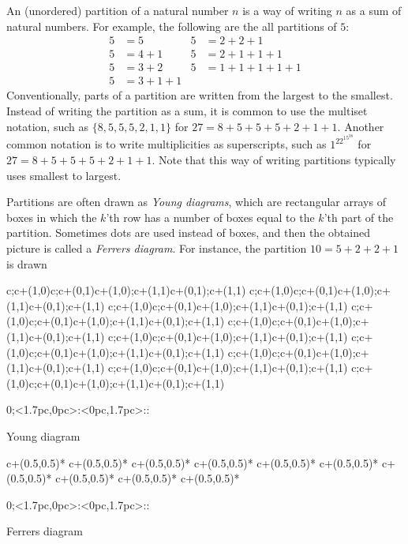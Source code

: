 \documentclass[12pt]{article}
\makeatletter
\def\drawsqlat{%
\begin{xy}{
  0;<1.7pc,0pc>:<0pc,1.7pc>::
  \xylattice{0}{6}{0}{6}}
\end{xy}}
\def\drawsq{\ar@{-}c;c+(1,0)\ar@{-}c;c+(0,1)\ar@{-}c+(1,0);c+(1,1)\ar@{-}c+(0,1);c+(1,1)}
\def\drawsqlabel#1{\save c+(0.5,0.5)*\txt<2pc>{#1} \restore}
\makeatother
\begin{document}

An (unordered) partition of a natural number $n$ is a way of writing $n$ as a
sum of natural numbers. For example, the following are the all
partitions of $5$:
\begin{align*}
5&=5&5&=2+2+1\\
5&=4+1&5&=2+1+1+1\\
5&=3+2&5&=1+1+1+1+1\\
5&=3+1+1
\end{align*}
Conventionally, parts of a partition are written from the largest
to the smallest. Instead of writing the partition as a sum, it is common to use the multiset notation, such as $\{8,5,5,5,2,1,1\}$ for $27=8+5+5+5+2+1+1$. Another common notation is to write multiplicities as superscripts, such as $1^22^15^38$ for $27=8+5+5+5+2+1+1$. Note that this way of writing partitions typically uses smallest to largest.

Partitions are often drawn as \emph{Young
diagrams}, which are rectangular arrays of boxes in which the $k$'th
row has a number of boxes equal to the $k$'th part of the
partition. Sometimes dots are used instead of boxes, and then the
obtained picture is called a \emph{Ferrers diagram}. For instance,
the partition $10=5+2+2+1$ is drawn

\begin{center}
\parbox[b]{10pc}{
\begin{renewcommand}{\latticebody}{%
\ifnum{} \ifnum{} \drawsq\fi\fi
\ifnum{} \ifnum{} \drawsq\fi\fi
\ifnum{} \ifnum{} \drawsq\fi\fi
\ifnum{} \ifnum{} \drawsq\fi\fi
\ifnum{} \ifnum{} \drawsq\fi\fi
\ifnum{} \ifnum{} \drawsq\fi\fi
\ifnum{} \ifnum{} \drawsq\fi\fi
\ifnum{} \ifnum{} \drawsq\fi\fi
\ifnum{} \ifnum{} \drawsq\fi\fi
\ifnum{} \ifnum{} \drawsq\fi\fi}
\drawsqlat
\end{renewcommand} 
Young diagram}\quad
\parbox[b]{10pc}{\begin{renewcommand}{\latticebody}{%
\ifnum{} \ifnum{} \drawsqlabel{$\bullet$}\fi\fi
\ifnum{} \ifnum{} \drawsqlabel{$\bullet$}\fi\fi
\ifnum{} \ifnum{} \drawsqlabel{$\bullet$}\fi\fi
\ifnum{} \ifnum{} \drawsqlabel{$\bullet$}\fi\fi
\ifnum{} \ifnum{} \drawsqlabel{$\bullet$}\fi\fi
\ifnum{} \ifnum{} \drawsqlabel{$\bullet$}\fi\fi
\ifnum{} \ifnum{} \drawsqlabel{$\bullet$}\fi\fi
\ifnum{} \ifnum{} \drawsqlabel{$\bullet$}\fi\fi
\ifnum{} \ifnum{} \drawsqlabel{$\bullet$}\fi\fi
\ifnum{} \ifnum{} \drawsqlabel{$\bullet$}\fi\fi
}\drawsqlat
\end{renewcommand} Ferrers diagram}
\end{center}
\end{document}
